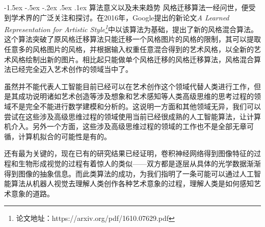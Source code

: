\documentclass[a4paper, 11pt]{article}
\makeatletter
\newcommand{\sihao}{\fontsize{14pt}{\baselineskip}\selectfont}
\renewcommand\section{\@startsection{section}{1}{\z@}%
{-1.5ex \@plus -.5ex \@minus -.2ex}%
{.5ex \@plus .1ex}%
{\normalfont\sihao\CJKfamily{hei}}}
\makeatother
\begin{document}
\section{算法意义以及未来趋势}
风格迁移算法一经问世，便受到学术界的广泛关注和探讨。在2016年，Google提出的新论文\emph{A Learned Representation for Artistic Style\footnote{论文地址：https://arxiv.org/pdf/1610.07629.pdf}}中以该算法为基础，提出了新的风格混合算法。这个算法突破了原风格迁移算法只能迁移一个风格图片的风格的限制，其可以提取任意多的风格图片的风格，并根据输入权重任意混合得到的艺术风格，以全新的艺术风格绘制出新的图片。相比起只能做单个风格迁移的风格迁移算法，风格混合算法已经完全迈入艺术创作的领域当中了。

虽然并不能代表人工智能目前已经可以在艺术创作这个领域代替人类进行工作，但是其成功说明诸如艺术创造等涉及想象和艺术感知等人类高级思维的思考过程的领域不是完全不能进行数学建模和分析的。这说明一方面和其他领域无异，我们可以尝试在这些涉及高级思维过程的领域使用当前已经很成熟的人工智能算法，让计算机介入。另外一个方面，这些涉及高级思维过程的领域的工作也不是全部无章可循，计算机拟合的可能性是有的。

还有最为关键的，现在已有的研究结果已经证明，卷积神经网络得到图像特征的过程和生物形成视觉的过程有着惊人的类似——双方都是逐层从具体的光学数据渐渐得到图像的抽象信息。而此类算法的成功，为我们指明了一条可能可以通过人工智能算法从机器人视觉去理解人类创作各种艺术意象的过程，理解人类是如何感知艺术意象的道路。



\end{document}
